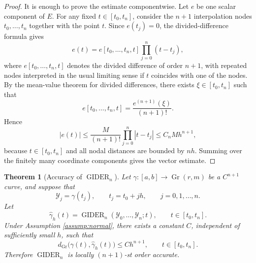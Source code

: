 \documentclass[a4paper,11pt]{article}
\DeclareMathOperator{\Gr}{Gr}
\newcommand{\GIDER}{\operatorname{GIDER}}
\numberwithin{equation}{section}
\theoremstyle{plain}
\newtheorem{thm}{Theorem}[section]
\theoremstyle{definition}
\theoremstyle{remark}
\begin{document}
\begin{proof}
It is enough to prove the estimate componentwise.  Let \(e\) be one scalar component of \(E\).  For any fixed \(t\in[t_0,t_n]\), consider the \(n+1\) interpolation nodes \(t_0,\ldots,t_n\) together with the point \(t\).  Since \(e(t_j)=0\), the divided-difference formula gives
\[
    e(t)
    =
    e[t_0,\ldots,t_n,t]
    \prod_{j=0}^n (t-t_j),
\]
where \(e[t_0,\ldots,t_n,t]\) denotes the divided difference of order \(n+1\), with repeated nodes interpreted in the usual limiting sense if \(t\) coincides with one of the nodes.  By the mean-value theorem for divided differences, there exists \(\xi\in[t_0,t_n]\) such that
\[
    e[t_0,\ldots,t_n,t]
    =
    \frac{e^{(n+1)}(\xi)}{(n+1)!}.
\]
Hence
\[
    |e(t)|
    \le
    \frac{M}{(n+1)!}
    \prod_{j=0}^n |t-t_j|
    \le
    C_n M h^{n+1},
\]
because \(t\in[t_0,t_n]\) and all nodal distances are bounded by \(nh\).  Summing over the finitely many coordinate components gives the vector estimate.
\end{proof}

\begin{thm}[Accuracy of \(\GIDER_n\)]\label{thm:gider_accuracy}
Let \(\gamma:[a,b]\to\Gr(r,m)\) be a \(C^{n+1}\) curve, and suppose that
\[
    \mathcal{Y}_j=\gamma(t_j),
    \qquad
    t_j=t_0+jh,
    \qquad j=0,1,\ldots,n.
\]
Let
\[
    \widehat{\gamma}_h(t)
    =
    \GIDER_n(\mathcal{Y}_0,\ldots,\mathcal{Y}_n;t),
    \qquad t\in[t_0,t_n].
\]
Under Assumption \ref{assump:normal}, there exists a constant \(C\), independent of sufficiently small \(h\), such that
\[
    d_{\Gr}\bigl(\gamma(t),\widehat{\gamma}_h(t)\bigr)
    \le
    C h^{n+1},
    \qquad t\in[t_0,t_n].
\]
Therefore \(\GIDER_n\) is locally \((n+1)\)-st order accurate.
\end{thm}
\end{document}
